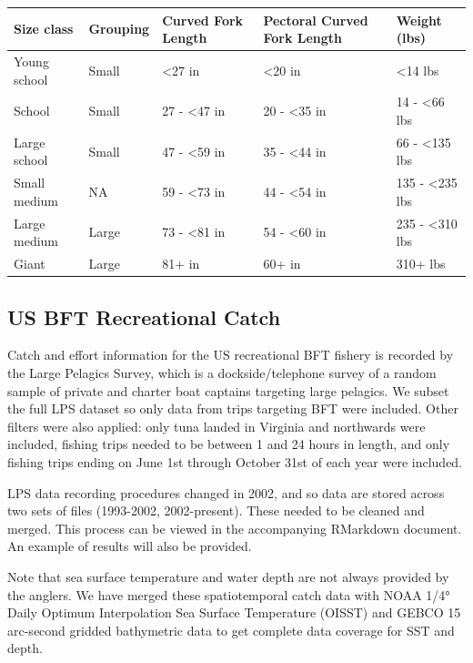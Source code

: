 \documentclass[
]{article}
\let\origtable\table
\let\endorigtable\endtable
\renewenvironment{table}[1][2] {
    \expandafter\origtable\expandafter[H]
} {
    \endorigtable
}
\begin{document}
\begin{table}[H]

\caption{\label{tab:size-table}Bluefin tuna size classes}
\centering
\begin{tabular}[t]{lllll}
\toprule
Size class & Grouping & Curved Fork
Length & Pectoral Curved
Fork Length & Weight (lbs)\\
\midrule
Young school & Small & <27 in & <20 in & <14 lbs\\
School & Small & 27 - <47 in & 20 - <35 in & 14 - <66 lbs\\
Large school & Small & 47 - <59 in & 35 - <44 in & 66 - <135 lbs\\
Small medium & NA & 59 - <73 in & 44 - <54 in & 135 - <235 lbs\\
Large medium & Large & 73 - <81 in & 54 - <60 in & 235 - <310 lbs\\
\addlinespace
Giant & Large & 81+ in & 60+ in & 310+ lbs\\
\bottomrule
\end{tabular}
\end{table}

\hypertarget{us-bft-recreational-catch}{%
\subsection{US BFT Recreational Catch}\label{us-bft-recreational-catch}}

Catch and effort information for the US recreational BFT fishery is recorded by the Large Pelagics Survey, which is a dockside/telephone survey of a random sample of private and charter boat captains targeting large pelagics. We subset the full LPS dataset so only data from trips targeting BFT were included. Other filters were also applied: only tuna landed in Virginia and northwards were included, fishing trips needed to be between 1 and 24 hours in length, and only fishing trips ending on June 1st through October 31st of each year were included.

LPS data recording procedures changed in 2002, and so data are stored across two sets of files (1993-2002, 2002-present). These needed to be cleaned and merged. This process can be viewed in the accompanying RMarkdown document. An example of results will also be provided.

Note that sea surface temperature and water depth are not always provided by the anglers. We have merged these spatiotemporal catch data with NOAA 1/4° Daily Optimum Interpolation Sea Surface Temperature (OISST) and GEBCO 15 arc-second gridded bathymetric data to get complete data coverage for SST and depth.
\end{document}
